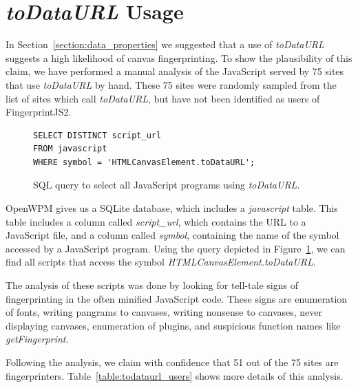\documentclass[
    fontsize=12pt,
    headings=small,
    parskip=half,
    bibliography=totoc,
    numbers=noenddot,
    open=any
    ]{scrreprt}
\begin{document}
\section{\textit{toDataURL} Usage}
In Section~\ref{section:data_properties} we suggested that a use of \textit{toDataURL}
suggests a high likelihood of canvas fingerprinting.
To show the plausibility of this claim, we have performed a manual analysis of the JavaScript served by
75 sites that use \textit{toDataURL} by hand.
These 75 sites were randomly sampled from the list of sites which call \textit{toDataURL},
but have not been identified as users of FingerprintJS2.

\begin{figure}
\centering
\begin{verbatim}
SELECT DISTINCT script_url
FROM javascript
WHERE symbol = 'HTMLCanvasElement.toDataURL';
\end{verbatim}
\caption{SQL query to select all JavaScript programs using \textit{toDataURL}.}
\label{code:todataurl_users_query}
\end{figure}

OpenWPM gives us a SQLite database, which includes a \textit{javascript} table.
This table includes a column called \textit{script\_url}, which contains
the URL to a JavaScript file, and a column called \textit{symbol}, containing
the name of the symbol accessed by a JavaScript program.
Using the query depicted in Figure~\ref{code:todataurl_users_query}, we can find all scripts
that access the symbol \textit{HTMLCanvasElement.toDataURL}.

The analysis of these scripts was done by looking for tell-tale signs of fingerprinting
in the often minified JavaScript code.
These signs are enumeration of fonts, writing pangrams to canvases, writing nonsense
to canvases, never displaying canvases, enumeration of plugins, and suspicious function
names like \textit{getFingerprint}.

Following the analysis, we claim with confidence that 51 out of the 75 sites are fingerprinters.
Table~\ref{table:todataurl_users} shows more details of this analysis.
\end{document}
